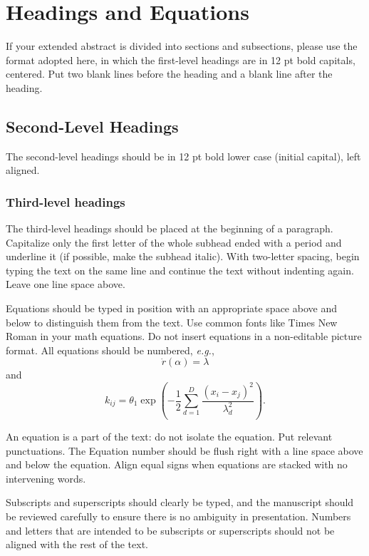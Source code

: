 \documentclass[upint,varvw]{prtec}
\begin{document}
\section{Headings and Equations}

If your extended abstract is divided into sections and subsections, please use the format adopted here, in which the first-level headings are in 12 pt bold capitals, centered. Put two blank lines before the heading and a blank line after the heading.

\subsection{Second-Level Headings}  The second-level headings should be in 12 pt bold lower case (initial capital), left aligned.

\subsubsection{Third-level headings} The third-level headings should be placed at the beginning of a paragraph. Capitalize only the first letter of the whole subhead ended with a period and underline it (if possible, make the subhead italic). With two-letter spacing, begin typing the text on the same line and continue the text without indenting again. Leave one line space above.

Equations should be typed in position with an appropriate space above and below to distinguish them from the text. Use common fonts like Times New Roman in your math equations. Do not insert equations in a non-editable picture format. All equations should be numbered, \textit{e.g.}, 
\begin{equation}
\dot{r}(\alpha) = \lambda
\end{equation}
and
\begin{equation}
k_{ij} = \theta_1\exp\left(-\frac{1}{2}\sum_{d=1}^D \frac{(x_i-x_j)^2}{\lambda_d^2}\right).
\end{equation}

An equation is a part of the text: do not isolate the equation. Put relevant punctuations. The Equation number should be flush right with a line space above and below the equation. Align equal signs when 
equations are stacked with no intervening words.

Subscripts and superscripts should clearly be typed, and the manuscript should be reviewed carefully to ensure there is no ambiguity in presentation. Numbers and letters that are intended to be subscripts or superscripts should not be aligned with the rest of the text.
\end{document}
